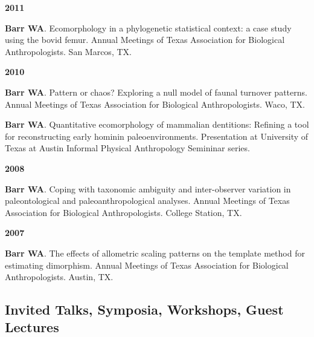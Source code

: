 \documentclass{article}
\begin{document}
\begin{description*}
\begin{minipage}{\linewidth}
\item[] {\bfseries 2011}
\item[] {\bfseries Barr WA}. Ecomorphology in a phylogenetic statistical context: a case study using the bovid femur. Annual Meetings of Texas Association for Biological Anthropologists. San Marcos, TX.
\end{minipage}
\end{description*}


\begin{description*}
\item[] {\bfseries 2010}
\item[] {\bfseries Barr WA}. Pattern or chaos? Exploring a null model of faunal turnover patterns. Annual Meetings of Texas Association for Biological Anthropologists. Waco, TX.

\item[] {\bfseries Barr WA}. Quantitative ecomorphology of mammalian dentitions: Refining a tool for reconstructing early hominin paleoenvironments. Presentation at University of Texas at Austin Informal Physical Anthropology Semininar series.
\end{description*}
\begin{description*}
\item[] {\bfseries 2008}
\item[] {\bfseries Barr WA}. Coping with taxonomic ambiguity and inter-observer variation in paleontological and paleoanthropological analyses. Annual Meetings of Texas Association for Biological Anthropologists. College Station, TX.
\end{description*}
\begin{description*}
\item[] {\bfseries 2007}
\item[] {\bfseries Barr WA}. The effects of allometric scaling patterns on the template method for estimating dimorphism. Annual Meetings of Texas Association for Biological Anthropologists. Austin, TX.
\end{description*}


\subsection*{Invited Talks, Symposia, Workshops, Guest Lectures}
\end{document}
